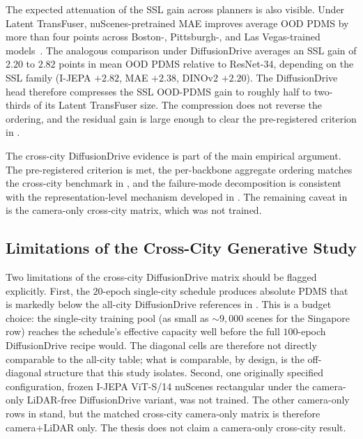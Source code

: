 The expected attenuation of the SSL gain across planners is also visible. Under Latent TransFuser, nuScenes-pretrained MAE improves average OOD PDMS by more than four points across Boston-, Pittsburgh-, and Las Vegas-trained models~\cite{naeinian-cross-city-2026}. The analogous comparison under DiffusionDrive averages an SSL gain of $2.20$ to $2.82$ points in mean OOD PDMS relative to ResNet-34, depending on the SSL family (I-JEPA $+2.82$, MAE $+2.38$, DINOv2 $+2.20$). The DiffusionDrive head therefore compresses the SSL OOD-PDMS gain to roughly half to two-thirds of its Latent TransFuser size. The compression does not reverse the ordering, and the residual gain is large enough to clear the pre-registered criterion in .

The cross-city DiffusionDrive evidence is part of the main empirical argument. The pre-registered criterion is met, the per-backbone aggregate ordering matches the cross-city benchmark in , and the failure-mode decomposition is consistent with the representation-level mechanism developed in . The remaining caveat in  is the camera-only cross-city matrix, which was not trained.

\subsection{Limitations of the Cross-City Generative Study}
\label{sec:exp-phase3-limitations}

Two limitations of the cross-city DiffusionDrive matrix should be flagged explicitly. First, the $20$-epoch single-city schedule produces absolute PDMS that is markedly below the all-city DiffusionDrive references in . This is a budget choice: the single-city training pool (as small as $\sim 9{,}000$ scenes for the Singapore row) reaches the schedule's effective capacity well before the full $100$-epoch DiffusionDrive recipe would. The diagonal cells are therefore not directly comparable to the all-city table; what is comparable, by design, is the off-diagonal structure that this study isolates. Second, one originally specified configuration, frozen I-JEPA ViT-S/14 nuScenes rectangular under the camera-only LiDAR-free DiffusionDrive variant, was not trained. The other camera-only rows in  stand, but the matched cross-city camera-only matrix is therefore camera+LiDAR only. The thesis does not claim a camera-only cross-city result.

